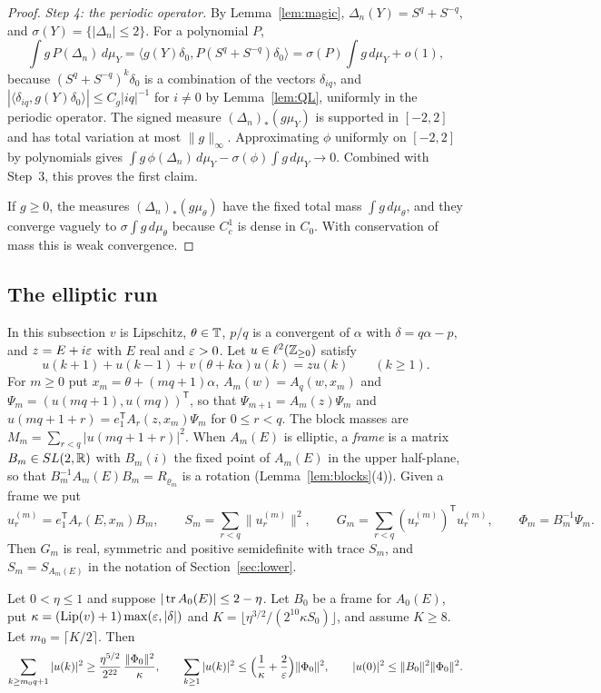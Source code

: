 \begin{proof}
\emph{Step 4: the periodic operator.} By Lemma~\ref{lem:magic}, $\Delta_n(Y)=S^q+S^{-q}$, and $\sigma(Y)=\{|\Delta_n|\le2\}$. For a polynomial $P$,
\[
\int g\,P(\Delta_n)\,d\mu_Y=\langle g(Y)\delta_0,P(S^q+S^{-q})\delta_0\rangle=\sigma(P)\int g\,d\mu_Y+o(1),
\]
because $(S^q+S^{-q})^k\delta_0$ is a combination of the vectors $\delta_{iq}$, and $|\langle\delta_{iq},g(Y)\delta_0\rangle|\le C_g|iq|^{-1}$ for $i\ne0$ by Lemma~\ref{lem:QL}, uniformly in the periodic operator. The signed measure $(\Delta_n)_*(g\mu_Y)$ is supported in $[-2,2]$ and has total variation at most $\|g\|_\infty$. Approximating $\phi$ uniformly on $[-2,2]$ by polynomials gives $\int g\,\phi(\Delta_n)\,d\mu_Y-\sigma(\phi)\int g\,d\mu_Y\to0$. Combined with Step~3, this proves the first claim.

If $g\ge0$, the measures $(\Delta_n)_*(g\mu_\theta)$ have the fixed total mass $\int g\,d\mu_\theta$, and they converge vaguely to $\sigma\int g\,d\mu_\theta$ because $C_c^1$ is dense in $C_0$. With conservation of mass this is weak convergence.
\end{proof}

\subsection{The elliptic run}\label{sec:run}

In this subsection $v$ is Lipschitz, $\theta\in\mathbb T$, $p/q$ is a convergent of $\alpha$ with $\delta=q\alpha-p$, and $z=E+i\varepsilon$ with $E$ real and $\varepsilon>0$. Let $u\in\ell^2(\mathbb Z_{\ge0})$ satisfy
\[
u(k+1)+u(k-1)+v(\theta+k\alpha)u(k)=zu(k)\qquad(k\ge1).
\]
For $m\ge0$ put $x_m=\theta+(mq+1)\alpha$, $A_m(w)=A_q(w,x_m)$ and $\Psi_m=(u(mq+1),u(mq))^{\mathsf T}$, so that $\Psi_{m+1}=A_m(z)\Psi_m$ and $u(mq+1+r)=e_1^{\mathsf T}A_r(z,x_m)\Psi_m$ for $0\le r<q$. The block masses are $M_m=\sum_{r<q}|u(mq+1+r)|^2$. When $A_m(E)$ is elliptic, a \emph{frame} is a matrix $B_m\in SL(2,\mathbb R)$ with $B_m(i)$ the fixed point of $A_m(E)$ in the upper half-plane, so that $B_m^{-1}A_m(E)B_m=R_{\varrho_m}$ is a rotation (Lemma~\ref{lem:blocks}(4)). Given a frame we put
\[
u^{(m)}_r=e_1^{\mathsf T}A_r(E,x_m)B_m,\qquad S_m=\sum_{r<q}\|u^{(m)}_r\|^2,\qquad G_m=\sum_{r<q}(u^{(m)}_r)^{\mathsf T}u^{(m)}_r,\qquad\Phi_m=B_m^{-1}\Psi_m .
\]
Then $G_m$ is real, symmetric and positive semidefinite with trace $S_m$, and $S_m=S_{A_m(E)}$ in the notation of Section~\ref{sec:lower}.

\begin{lemma}\label{lem:run}
Let $0<\eta\le1$ and suppose $|\operatorname{tr} A_0(E)|\le2-\eta$. Let $B_0$ be a frame for $A_0(E)$, put $\kappa=(\operatorname{Lip}(v)+1)\max(\varepsilon,|\delta|)$ and $K=\lfloor\eta^{3/2}/(2^{10}\kappa S_0)\rfloor$, and assume $K\ge8$. Let $m_0=\lceil K/2\rceil$. Then
\[
\sum_{k\ge m_0q+1}|u(k)|^2\ge\frac{\eta^{5/2}}{2^{22}}\,\frac{\|\Phi_0\|^2}{\kappa},\qquad\sum_{k\ge1}|u(k)|^2\le\Bigl(\frac1\kappa+\frac2{\varepsilon}\Bigr)\|\Phi_0\|^2,\qquad|u(0)|^2\le\|B_0\|^2\|\Phi_0\|^2.
\]
\end{lemma}

